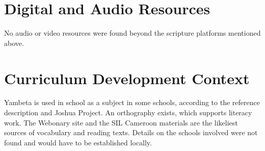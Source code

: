 \documentclass[12pt]{article}
\begin{document}
\section{Digital and Audio Resources}
No audio or video resources were found beyond the scripture platforms mentioned above.

\section{Curriculum Development Context}
Yambeta is used in school as a subject in some schools, according to the reference description and Joshua Project. An orthography exists, which supports literacy work. The Webonary site and the SIL Cameroon materials are the likeliest sources of vocabulary and reading texts. Details on the schools involved were not found and would have to be established locally.
\end{document}
